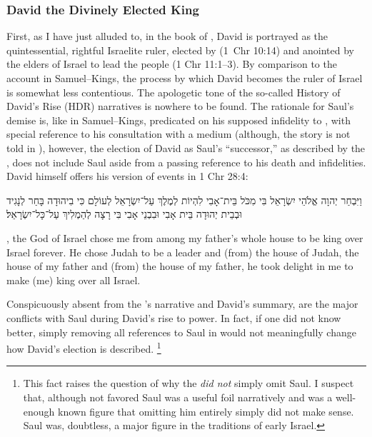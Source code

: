 \subsubsection{David the Divinely Elected King}
First, as I have just alluded to, in the book of \chronicles, David is portrayed as the quintessential, rightful Israelite ruler, elected by \yahweh (1~Chr 10:14) and anointed by the elders of Israel to lead the people (1 Chr 11:1--3). By comparison to the account in Samuel--Kings, the process by which David becomes the ruler of Israel is somewhat less contentious. The apologetic tone of the so-called History of David's Rise (HDR) narratives is nowhere to be found. The rationale for Saul's demise is, like in Samuel--Kings, predicated on his supposed infidelity to \yahweh, with special reference to his consultation with a medium (although, the story is not told in \chronicles), however, the election of David as Saul's ``successor,'' as described by the \chronicler, does not include Saul aside from a passing reference to his death and infidelities. David himself offers his version of events in 1 Chr 28:4:
\begin{hebrewtext}
    וַיִּבְחַר יְהוָה אֱלֹהֵי יִשְׂרָאֵל בִּי מִכֹּל בֵּית־אָבִי לִהְיוֹת לְמֶלֶךְ עַל־יִשְׂרָאֵל לְעוֹלָם כִּי בִיהוּדָה בָּחַר לְנָגִיד וּבְבֵית יְהוּדָה בֵּית אָבִי וּבִבְנֵי אָבִי בִּי רָצָה לְהַמְלִיךְ עַל־כָּל־יִשְׂרָאֵל׃ 
\end{hebrewtext}
\begin{translation}
    \yahweh, the God of Israel chose me from among my father's whole house to be king over Israel forever. He chose Judah to be a leader and (from) the house of Judah, the house of my father and (from) the house of my father, he took delight in me to make (me) king over all Israel.
\end{translation}
Conspicuously absent from the \chronicler's narrative and David's summary, are the major conflicts with Saul during David's rise to power. In fact, if one did not know better, simply removing all references to Saul in \chronicles would not meaningfully change how David's election is described.%
    \footnote{This fact raises the question of why the \chronicler \emph{did not} simply omit Saul. I suspect that, although not favored Saul was a useful foil narratively and was a well-enough known figure that omitting him entirely simply did not make sense. Saul was, doubtless, a major figure in the traditions of early Israel.}

